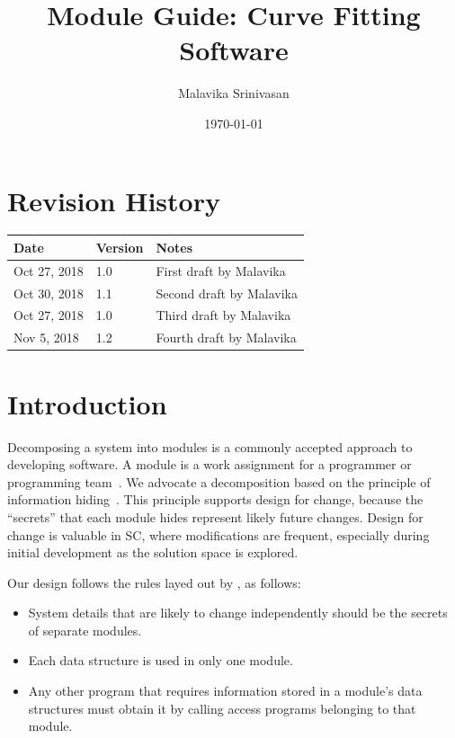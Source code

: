 \documentclass[12pt, titlepage]{article}
\begin{document}
\title{Module Guide: Curve Fitting Software} 
\author{Malavika Srinivasan}
\date{\today}

\maketitle


\section{Revision History}

\begin{tabularx}{\textwidth}{p{3cm}p{2cm}X}
\toprule {\bf Date} & {\bf Version} & {\bf Notes}\\
\midrule
Oct 27, 2018 & 1.0 & First draft by Malavika\\
Oct 30, 2018 & 1.1 & Second draft by Malavika\\
Oct 27, 2018 & 1.0 & Third draft by Malavika\\
Nov 5, 2018 & 1.2 & Fourth draft by Malavika\\
\bottomrule
\end{tabularx}

\newpage

\tableofcontents

\listoftables

\listoffigures

\newpage


\section{Introduction}

Decomposing a system into modules is a commonly accepted approach to developing
software.  A module is a work assignment for a programmer or programming
team~\citep{ParnasEtAl1984}.  We advocate a decomposition
based on the principle of information hiding~\citep{Parnas1972a}.  This
principle supports design for change, because the ``secrets'' that each module
hides represent likely future changes.  Design for change is valuable in SC,
where modifications are frequent, especially during initial development as the
solution space is explored.  

Our design follows the rules layed out by \citet{ParnasEtAl1984}, as follows:
\begin{itemize}
\item System details that are likely to change independently should be the
  secrets of separate modules.
\item Each data structure is used in only one module.
\item Any other program that requires information stored in a module's data
  structures must obtain it by calling access programs belonging to that module.
\end{itemize}
\end{document}
